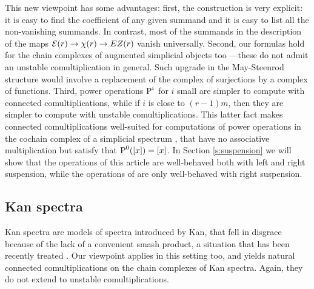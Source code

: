 This new viewpoint has some advantages: first, the construction is very explicit: it is easy to find the coefficient of any given summand and it is easy to list all the non-vanishing summands. In contrast, most of the summands in the description of the maps $\mathcal{E}(r)\to \chi(r)\to EZ(r)$ vanish universally. Second, our formulas hold for the chain complexes of augmented simplicial objects too ---these do not admit an unstable comultiplication in general. Such upgrade in the May-Steenrod structure would involve a replacement of the complex of surjections by a complex of functions. Third, power operations $\operatorname{P}^i$ for $i$ small are simpler to compute with connected comultiplications, while if $i$ is close to $(r-1)m$, then they are simpler to compute with unstable comultiplications. This latter fact makes connected comultiplications well-suited for computations of power operations in the cochain complex of a simplicial spectrum \cite{Gill2020}, that have no associative multiplication but satisfy that $\operatorname{P}^0([x])=[x]$. In Section \ref{s:suspension} we will show that the operations of this article are well-behaved both with left and right suspension, while the operations of \cite{medina2021may_st} are only well-behaved with right suspension.

\subsection*{Kan spectra} Kan spectra \cite{Kan1963} are models of spectra introduced by Kan, that fell in disgrace because of the lack of a convenient smash product, a situation that has been recently treated \cite{CKP2023}. Our viewpoint applies in this setting too, and yields natural connected comultiplications on the chain complexes of Kan spectra. Again, they do not extend to unstable comultiplications.



